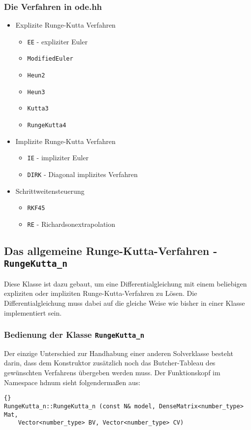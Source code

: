 \documentclass[a4paper,11pt]{article}
\theoremstyle{definition}
\begin{document}
\subsubsection{Die Verfahren in ode.hh}
\begin{itemize}
	\item Explizite Runge-Kutta Verfahren
	\begin{itemize}
		\item\lstinline{EE} - expliziter Euler
		\item\lstinline{ModifiedEuler}
		\item\lstinline{Heun2}
		\item\lstinline{Heun3}
		\item\lstinline{Kutta3}
		\item\lstinline{RungeKutta4}
	\end{itemize}
	\item Implizite Runge-Kutta Verfahren
	\begin{itemize}	
		\item \lstinline{IE} - impliziter Euler
		\item \lstinline{DIRK} - Diagonal implizites Verfahren
	\end{itemize}
	\item Schrittweitensteuerung
	\begin{itemize}
		\item\lstinline{RKF45}
		\item\lstinline{RE} - Richardsonextrapolation
	\end{itemize}
\end{itemize}
\subsection{Das allgemeine Runge-Kutta-Verfahren - \lstinline{RungeKutta_n}}
Diese Klasse ist dazu gebaut, um eine Differentialgleichung mit einem beliebigen expliziten oder impliziten Runge-Kutta-Verfahren zu Lösen. Die Differentialgleichung muss dabei auf die gleiche Weise wie bisher in einer Klasse implementiert sein. 

\subsubsection{Bedienung der Klasse \lstinline{RungeKutta_n}}
Der einzige Unterschied zur Handhabung einer anderen Solverklasse besteht darin, dass dem Konstruktor zusätzlich noch das Butcher-Tableau des gewünschten Verfahrens übergeben werden muss. Der Funktionskopf im Namespace hdnum sieht folgendermaßen aus:
{\footnotesize{\begin{lstlisting}{}
RungeKutta_n::RungeKutta_n (const N& model, DenseMatrix<number_type> Mat, 
    Vector<number_type> BV, Vector<number_type> CV)
\end{lstlisting}}}
\end{document}
